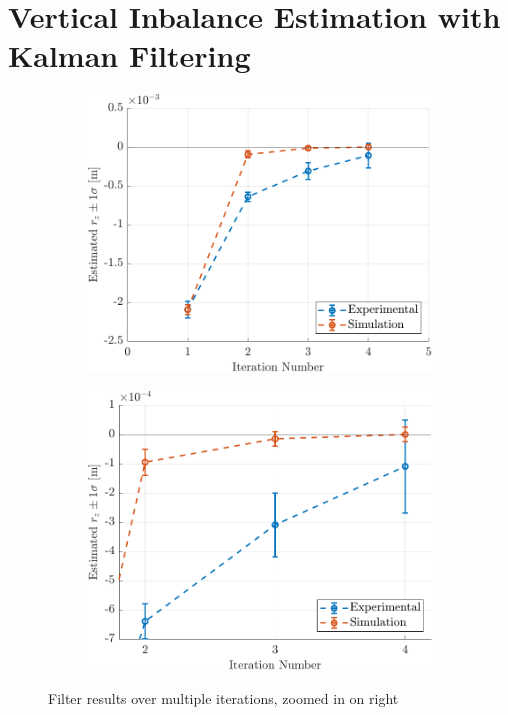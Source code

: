 \section{Vertical Inbalance Estimation with Kalman Filtering}


\begin{figure}[!ht]
  \centering
  \begin{subfigure}[t]{0.47\textwidth}
    \includegraphics[width=\linewidth]{plots/UKF_comparison.pdf}
  \end{subfigure}\hfill
  \begin{subfigure}[t]{0.47\textwidth}
    \includegraphics[width=\linewidth]{plots/UKF_comparison_zoomed.pdf}
  \end{subfigure}
  \caption{Filter results over multiple iterations, zoomed in on right}
  \label{fig:UKF_comparison}
\end{figure}


